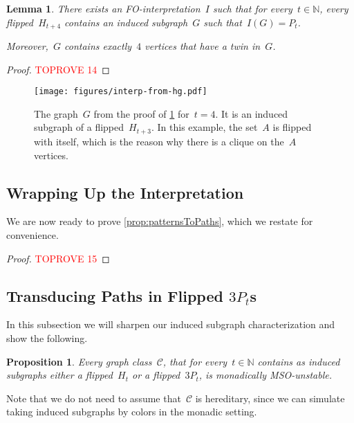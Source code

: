 \documentclass[11pt]{article}      \usepackage[margin=1in]{geometry}  \usepackage{microtype}
\newtheorem{lemma}[theorem]{Lemma}
\newtheorem{proposition}[theorem]{Proposition}
\theoremstyle{definition}
\newcommand{\N}[0]{\mathrm{\mathbb{N}}}
\newcommand{\CC}{\mathcal{C}}
\begin{document}
\begin{lemma}\label{lem:paths-from-hg}
    There exists an FO-interpretation~$I$ such that for every~$t\in \N$, every flipped~$H_{t+4}$ contains an induced subgraph~$G$ such that~$I(G)= P_t$.
    
    \smallskip\noindent
    Moreover,~$G$ contains exactly~$4$ vertices that have a twin in~$G$.
\end{lemma}

\begin{proof}\textcolor{red}{TOPROVE 14}\end{proof}

\begin{figure}[htbp]
    \centering
    \texttt{[image: figures/interp-from-hg.pdf]}
    \caption{The graph~$G$ from the proof of \cref{lem:paths-from-hg} for~$t=4$.
    It is an induced subgraph of a flipped~$H_{t+3}$. In this example, the set~$A$ is flipped with itself, which is the reason why there is a clique on the~$A$ vertices.}
    \label{fig:interp-from-hg}
\end{figure}

\subsection{Wrapping Up the Interpretation}

We are now ready to prove \cref{prop:patternsToPaths}, which we restate for convenience.

\propPatternsToPaths*

\begin{proof}\textcolor{red}{TOPROVE 15}\end{proof}


\subsection{Transducing Paths in Flipped \texorpdfstring{$3P_t$s}{3Pts}}

In this subsection we will sharpen our induced subgraph characterization and show the following.
\begin{proposition}
    \label{prop:3ptUnstable}
        Every graph class~$\CC$, that for every~$t\in\N$ contains as induced subgraphs either a flipped~$H_t$ or a flipped~$3P_t$, is monadically MSO-unstable.
\end{proposition}
Note that we do not need to assume that~$\CC$ is hereditary, since we can simulate taking induced subgraphs by colors in the monadic setting.
\end{document}
